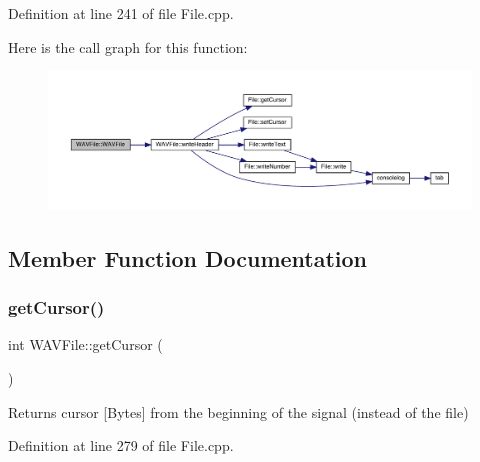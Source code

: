 Definition at line 241 of file File.\+cpp.

Here is the call graph for this function\+:
\nopagebreak
\begin{figure}[H]
\begin{center}
\leavevmode
\includegraphics[width=350pt]{class_w_a_v_file_a01baafcc33b738c26163b46bd05dde1d_cgraph}
\end{center}
\end{figure}


\subsection{Member Function Documentation}
\mbox{\label{class_w_a_v_file_a09b0c9107c31966537eaef404abbe0c6}} 
\subsubsection{\texorpdfstring{get\+Cursor()}{getCursor()}}
{\footnotesize\ttfamily int W\+A\+V\+File\+::get\+Cursor (\begin{DoxyParamCaption}{ }\end{DoxyParamCaption})}

\begin{DoxyReturn}{Returns}
cursor \mbox{[}Bytes\mbox{]} from the beginning of the signal (instead of the file) 
\end{DoxyReturn}


Definition at line 279 of file File.\+cpp.

